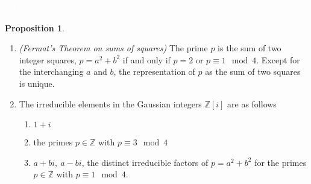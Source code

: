 \documentclass{article}
\theoremstyle{definition}
\newtheorem{prop}[thm]{Proposition}
\newcommand{\nl}{\textcolor{white}{nothing}}
\newcommand{\Z}{\mathbb{Z}}
\begin{document}
\nl

\begin{prop}\nl
\begin{enumerate}
\item \textit{(Fermat's Theorem on sums of squares)} The prime $p$ is the sum of two integer squares, $p = a^2 + b^2$ if and only if $p = 2$ or $p\equiv 1\mod 4$. Except for the interchanging $a$ and $b$, the representation of $p$ as the sum of two squares is unique. 
\item The irreducible elements in the Gaussian integers $\Z[i]$ are as follows
\begin{enumerate}
\item $1 + i$
\item the primes $p\in \Z$ with $p\equiv 3\mod 4$
\item $a + bi,\ a-bi$, the distinct irreducible factors of $p = a^2 + b^2$ for the primes $p\in \Z$ with $p\equiv 1\mod 4$.
\end{enumerate}
\end{enumerate}
\end{prop}
\end{document}
